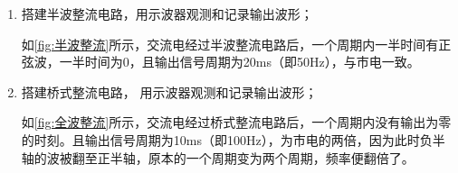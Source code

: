 \documentclass[dvipsnames, svgnames,a4paper,11pt]{article}
\begin{document}
		\begin{enumerate}
			\item 搭建半波整流电路，用示波器观测和记录输出波形；
			
				如\cref{fig:半波整流}所示，交流电经过半波整流电路后，一个周期内一半时间有正弦波，一半时间为0，且输出信号周期为20ms（即50Hz），与市电一致。






			\item 搭建桥式整流电路， 用示波器观测和记录输出波形；
			

				如\cref{fig:全波整流}所示，交流电经过桥式整流电路后，一个周期内没有输出为零的时刻。且输出信号周期为10ms（即100Hz），为市电的两倍，因为此时负半轴的波被翻至正半轴，原本的一个周期变为两个周期，频率便翻倍了。




				
				

\end{enumerate}
\end{document}
